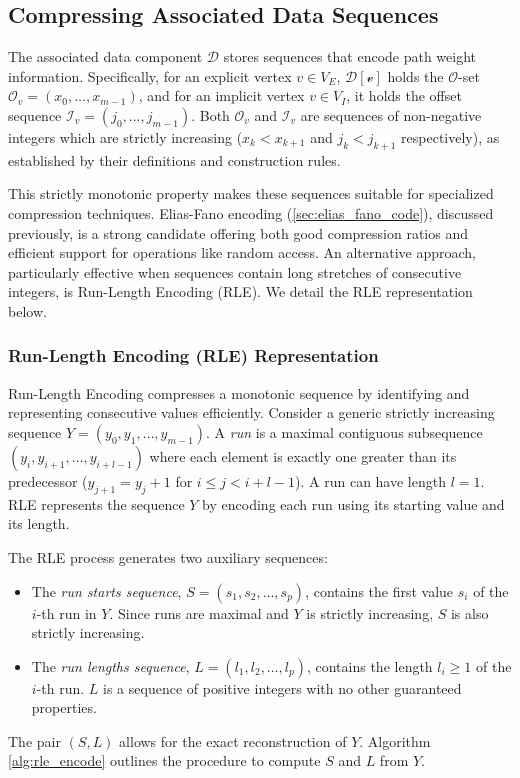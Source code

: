 \subsection{Compressing Associated Data Sequences}
\label{subsec:compressing_associated_data_sequences}

The associated data component $\mathcal{D}$ stores sequences that encode path weight information. Specifically, for an explicit vertex $v \in V_E$, $\mathcal{D[v]}$ holds the $\mathcal{O}$-set $\mathcal{O}_v = (x_0, \dots, x_{m-1})$, and for an implicit vertex $v \in V_I$, it holds the offset sequence $\mathcal{I}_v = (j_0, \dots, j_{m-1})$. Both $\mathcal{O}_v$ and $\mathcal{I}_v$ are sequences of non-negative integers which are strictly increasing ($x_k < x_{k+1}$ and $j_k < j_{k+1}$ respectively), as established by their definitions and construction rules.

This strictly monotonic property makes these sequences suitable for specialized compression techniques. Elias-Fano encoding (\autoref{sec:elias_fano_code}), discussed previously, is a strong candidate offering both good compression ratios and efficient support for operations like random access. An alternative approach, particularly effective when sequences contain long stretches of consecutive integers, is Run-Length Encoding (RLE). We detail the RLE representation below.

\subsubsection*{Run-Length Encoding (RLE) Representation}
Run-Length Encoding compresses a monotonic sequence by identifying and representing consecutive values efficiently. Consider a generic strictly increasing sequence $Y = (y_0, y_1, \dots, y_{m-1})$. A \emph{run} is a maximal contiguous subsequence $(y_i, y_{i+1}, \dots, y_{i+l-1})$ where each element is exactly one greater than its predecessor ($y_{j+1} = y_j + 1$ for $i \le j < i+l-1$). A run can have length $l=1$. RLE represents the sequence $Y$ by encoding each run using its starting value and its length.

The RLE process generates two auxiliary sequences:
\begin{itemize}
    \item The \emph{run starts sequence}, $S = (s_1, s_2, \dots, s_p)$, contains the first value $s_i$ of the $i$-th run in $Y$. Since runs are maximal and $Y$ is strictly increasing, $S$ is also strictly increasing.
    \item The \emph{run lengths sequence}, $L = (l_1, l_2, \dots, l_p)$, contains the length $l_i \ge 1$ of the $i$-th run. $L$ is a sequence of positive integers with no other guaranteed properties.
\end{itemize}
The pair $(S, L)$ allows for the exact reconstruction of $Y$. Algorithm \ref{alg:rle_encode} outlines the procedure to compute $S$ and $L$ from $Y$.

